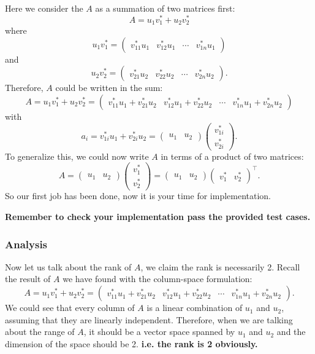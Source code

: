 \noindent Here we consider the $A$ as a summation of two matrices first:
\[
A = u_1v_1^{*} + u_2v_2^{*}
\]
where
\[
  u_1v_1^{*} = \begin{pmatrix} v_{11}^{*}u_1 & v_{12}^{*}u_1 & \cdots & v_{1n}^{*}u_1 \end{pmatrix} 
\]
and
\[
  u_2v_2^{*} = \begin{pmatrix} v_{21}^{*}u_2 & v_{22}^{*}u_2 & \cdots & v_{2n}^{*}u_2 \end{pmatrix} 
.\] 
Therefore, $A$ could be written in the sum:
\[
  A = u_1v_1^{*} + u_2v_2^{*} = \begin{pmatrix} v_{11}^{*}u_1 + v_{21}^{*}u_2 & v_{12}^{*}u_1 + v_{22}^{*}u_2 & \cdots & v_{1n}^{*}u_1 + v_{2n}^{*}u_2 \end{pmatrix} 
\]
with
\[
  a_{i} = v_{1i}^{*}u_1 + v_{2i}^{*}u_2 = \begin{pmatrix} u_1 & u_2 \end{pmatrix} \begin{pmatrix} v_{1i}^{*}\\ v_{2i}^{*} \end{pmatrix}
.\] 
To generalize this, we could now write $A$ in terms of a product of two matrices:
\[
A = \begin{pmatrix} u_1 & u_2 \end{pmatrix} \begin{pmatrix} v_{1}^{*}\\ v_{2}^{*} \end{pmatrix}   = \begin{pmatrix} u_1 & u_2 \end{pmatrix} \begin{pmatrix} v_{1}^{*} & v_{2}^{*} \end{pmatrix}^{\top}
.\]
So our first job has been done, now it is your time for implementation. \medskip

\noindent 
\textbf{Remember to check your implementation pass the provided test cases.}
\subsubsection*{Analysis}
Now let us talk about the rank of $A$, we claim the rank is necessarily 2.
Recall the result of $A$ we have found with the column-space formulation: 
\[
A = u_1v_1^{*} + u_2v_2^{*} = \begin{pmatrix} v_{11}^{*}u_1 + v_{21}^{*}u_2 & v_{12}^{*}u_1 + v_{22}^{*}u_2 & \cdots & v_{1n}^{*}u_1 + v_{2n}^{*}u_2 \end{pmatrix} 
.\]
We could see that every column of $A$ is a linear combination of $u_1$ and $u_2$, assuming that they are linearly independent. Therefore, when we are talking about the range of $A$, it should be a vector space spanned by $u_1$ and $u_2$ and the dimension of the space should be 2. \textbf{i.e. the rank is 2 obviously.} \checked

